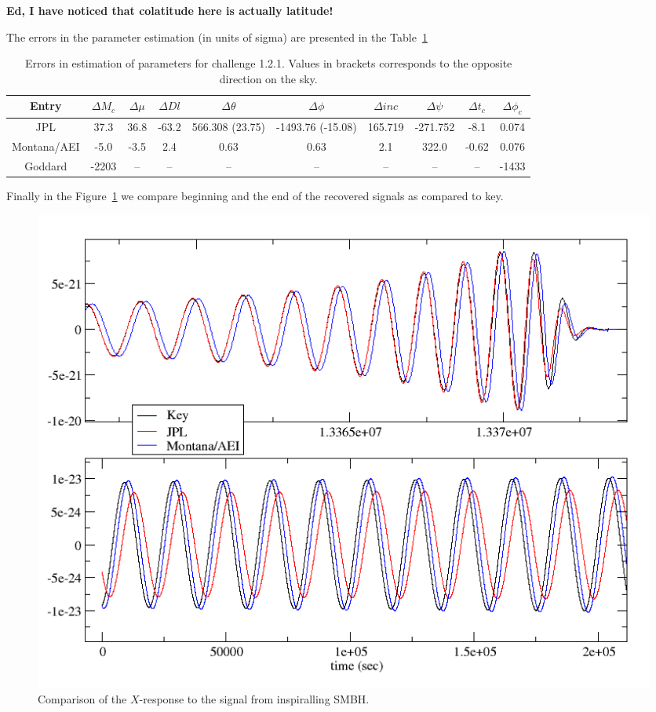 \documentclass[prd,aps,amsfonts,amsmath, nofootinbib]{revtex4}
\begin{document}
{\bf Ed, I have noticed that colatitude here is actually latitude!}

The errors in the parameter estimation (in units of sigma) are presented in the Table~\ref{Errors1.2.1}
\begin{table}
\caption{\label{Errors1.2.1} Errors in estimation of parameters for challenge 1.2.1. Values in brackets corresponds to the 
opposite direction on the sky.}
\begin{ruledtabular}
\begin{tabular}{|c|c|c|c|c|c|c|c|c|c|}
Entry & $\Delta M_c$ & $\Delta \mu $ & $\Delta Dl$ & $\Delta \theta $ & $\Delta \phi $ & $\Delta inc $ &
$\Delta \psi $ & $\Delta t_c $& $\Delta \phi_c $ \\ 
\hline
 JPL & 37.3& 36.8 &-63.2 & 566.308 (23.75)& -1493.76  (-15.08) & 165.719 & -271.752 & -8.1 &
0.074\\
Montana/AEI & -5.0 & -3.5 & 2.4  & 0.63 & 0.63 & 2.1 & 322.0 & -0.62 &  0.076 \\
Goddard & -2203 & -- & --  & --& -- & -- & -- & -- & -1433 \\
\hline
\end{tabular}
\end{ruledtabular}
\end{table}


Finally in the Figure~\ref{fig1.2.1} we compare beginning and the end of the recovered signals as compared
to key. 
\begin{figure}[ht]
\includegraphics[height=0.6\textheight,
keepaspectratio=true,angle=0]{1_2_1X}
\caption{Comparison of the $X$-response to the signal from inspiralling SMBH. }
\label{fig1.2.1}
\end{figure}
\end{document}
